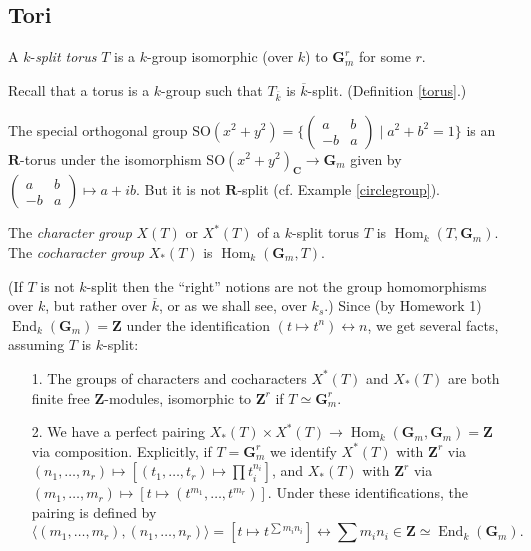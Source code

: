 \documentclass[10pt]{article}
\newcommand{\CC}{\mathbf{C}}
\newcommand{\RR}{\mathbf{R}}
\newcommand{\ZZ}{\mathbf{Z}}
\newcommand{\Hom}{\operatorname{Hom}}
\renewcommand{\(}{\left(}
\renewcommand{\)}{\right)}
\renewcommand{\bar}{\overline}
\newcommand{\End}{\operatorname{End}}
\newcommand{\SO}{\mathrm{SO}}
\numberwithin{thm}{subsection}
\begin{document}
\subsection{Tori}
\begin{defn}A $k$-\textit{split torus} $T$ is a $k$-group isomorphic
(over $k$) to $\mathbf{G}_m^r$ for some $r$.
\end{defn}
Recall that a torus is a $k$-group such that $T_{\bar k}$ is $\bar k$-split.
(Definition \ref{torus}.)
\begin{ex}\label{standardSO2}The special orthogonal
group $\SO(x^2+y^2)=\{\(\begin{smallmatrix}a&b\\-b&a\end{smallmatrix}\)\mid a^2+b^2=1\}$ is an $\RR$-torus under the isomorphism
$\SO(x^2+y^2)_\CC\to \mathbf{G}_m$ given by $\(\begin{smallmatrix}a&b\\-b&a\end{smallmatrix}\)\mapsto a+ib$. But it is not $\RR$-split (cf. Example \ref{circlegroup}).
\end{ex}
\begin{defn}The \textit{character group} $X(T)$ or $X^*(T)$ of a $k$-split torus
$T$ is $\Hom_k(T,\mathbf{G}_m)$.
The \textit{cocharacter group} $X_*(T)$ is $\Hom_k(\mathbf{G}_m,T)$.
\end{defn}
(If $T$ is not $k$-split then the ``right'' notions are not the group homomorphisms over $k$, but
rather over $\bar k$, or as we shall see, over $k_s$.) 
Since (by Homework 1) $\End_k(\mathbf{G}_m)=\ZZ$ under
the identification $(t\mapsto t^n)\leftrightarrow n$, we get several facts,
assuming $T$ is $k$-split:
\begin{enumerate}
\item[1. ]The groups of characters and cocharacters $X^*(T)$ and $X_*(T)$ are both finite free $\ZZ$-modules, isomorphic to $\ZZ^r$ if $T\simeq \mathbf{G}_m^r$.
\item[2. ]We have a perfect pairing $X_*(T)\times X^*(T)\to\Hom_k(\mathbf{G}_m,\mathbf{G}_m)=\ZZ$
via composition. Explicitly, if $T=\mathbf{G}_m^r$ we identify
$X^*(T)$ with $\ZZ^r$ via $(n_1,\ldots, n_r)\mapsto [(t_1,\ldots, t_r)\mapsto \prod t_i^{n_i}]$,
and $X_*(T)$ with $\ZZ^r$ via $(m_1,\ldots, m_r)\mapsto [t\mapsto(t^{m_1},\ldots, t^{m_r})]$.
Under these identifications, the pairing is defined by
\[\langle(m_1,\ldots,m_r),(n_1,\ldots, n_r)\rangle=[t\mapsto t^{\sum m_i n_i}]\leftrightarrow \sum m_in_i\in \ZZ\simeq \End_k(\mathbf{G}_m).\]
\end{enumerate}
\end{document}
